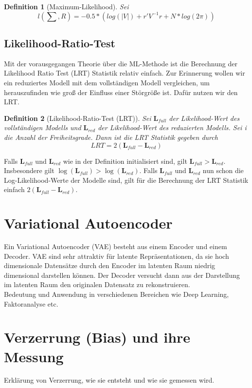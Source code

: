 \documentclass[%
thesis=student,%
coverpage=false,%
titlepage=false,%
headmarks=true, %
german,%
font=libertine, %
math=newpxtx, %
BCOR=5mm,%
coverBCOR=11mm%
]{tumbook}
\theoremstyle{break}
\newtheorem{definition}{Definition}[section]
\begin{document}
\begin{definition}[Maximum-Likelihood]
	Sei 
	$$ l(\sum,R) = -0.5 * (log(|V|)+ r'V^{-1}r + N * log(2\pi))$$
\end{definition}\noindent
\subsection{Likelihood-Ratio-Test}
Mit der vorausgegangen Theorie über die ML-Methode ist die Berechnung der Likelihood Ratio Test (LRT) Statistik relativ einfach. Zur Erinnerung wollen wir ein reduziertes Modell mit dem vollständigen Modell vergleichen, um herauszufinden wie groß der Einfluss einer Störgröße ist. Dafür nutzen wir den LRT. 
\begin{definition}[Likelihood-Ratio-Test (LRT)] 
	Sei $\mathbf{L}_{full}$ der Likelihood-Wert des vollständigen Modells und $\mathbf{L}_{red}$ der Likelihood-Wert des reduzierten Modells. Sei i die Anzahl der Freiheitsgrade. Dann ist die LRT Statistik gegeben durch 
	$$ LRT = 2(\mathbf{L}_{full}- \mathbf{L}_{red}) $$ 
\end{definition} \noindent
Falls $\mathbf{L}_{full}$ und $\mathbf{L}_{red}$ wie in der Definition initialisiert sind, gilt $\mathbf{L}_{full} > \mathbf{L}_{red}$. Insbesondere gilt $\log(\mathbf{L}_{full}) > \log(\mathbf{L}_{red})$.
Falls $\mathbf{L}_{full}$ und $\mathbf{L}_{red}$ nun schon die Log-Likelihood-Werte der Modelle sind, gilt für die Berechnung der LRT Statistik einfach $2(\mathbf{L}_{full} - \mathbf{L}_{red})$. \\
\section{Variational Autoencoder}
Ein Variational Autoencoder (VAE) besteht aus einem Encoder und einem Decoder. VAE sind sehr attraktiv für latente Repräsentationen, da sie hoch dimensionale Datensätze durch den Encoder im latenten Raum niedrig dimensional darstellen können. Der Decoder versucht dann aus der Darstellung im latenten Raum den originalen Datensatz zu rekonstruieren.\\ 
Bedeutung und Anwendung in verschiedenen Bereichen wie Deep Learning, Faktoranalyse etc.
\section{Verzerrung (Bias) und ihre Messung}
Erklärung von Verzerrung, wie sie entsteht und wie sie gemessen wird.
\end{document}
